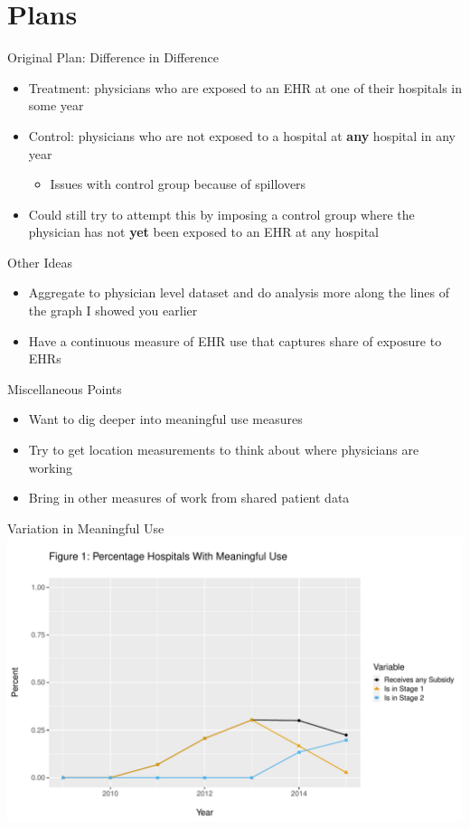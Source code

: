 \documentclass[10pt]{beamer}
\begin{document}
\section{Plans}

\begin{frame}{Original Plan: Difference in Difference}
\begin{itemize}
    \item Treatment: physicians who are exposed to an EHR at one of their hospitals in some year
    \item Control: physicians who are not exposed to a hospital at \textbf{any} hospital in any year
    \begin{itemize}
        \item  Issues with control group because of spillovers
    \end{itemize}
    \item Could still try to attempt this by imposing a control group where the physician has not \textbf{yet} been exposed to an EHR at any hospital
\end{itemize}
\end{frame}

\begin{frame}{Other Ideas}
\begin{itemize}
    \item Aggregate to physician level dataset and do analysis more along the lines of the graph I showed you earlier
    \item Have a continuous measure of EHR use that captures share of exposure to EHRs
\end{itemize}
\end{frame}

\begin{frame}{Miscellaneous Points}
\begin{itemize}
    \item Want to dig deeper into meaningful use measures
    \item Try to get location measurements to think about where physicians are working
    \item Bring in other measures of work from shared patient data
\end{itemize}
    
\end{frame}



\begin{frame}{Variation in Meaningful Use}
    \centering
    \includegraphics[scale=.5]{Objects/TYP_plot_hospmeanuse_year.pdf}
\end{frame}
\end{document}

